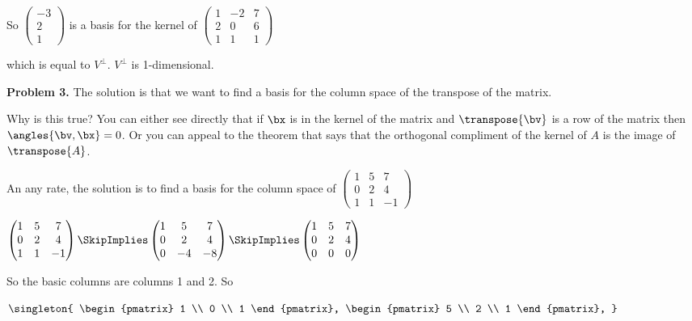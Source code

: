 \documentclass[oneside,12pt]{amsart}
\begin{document}
\bigskip

So $
\begin{pmatrix}
-3 \\ 2 \\ 1
\end{pmatrix}
$ is a basis for the kernel of $
\begin{pmatrix}
1 & -2 & 7\\
2 & 0 & 6 \\
1 & 1 & 1
\end{pmatrix}
$

which is equal to $V^{\perp}$. $V^{\perp}$ is 1-dimensional.

\bigskip
\bigskip

\textbf{Problem 3.} The solution
is that we want to find a basis for the column space of the transpose of the
matrix.

\bigskip

Why is this true? You can either see directly that if $\bx$
is in the kernel of the matrix and $\transpose{\bv}$ is a row of the matrix
then $\angles{\bv,\bx} = 0$. Or you can appeal to the theorem that says that
the orthogonal compliment of the kernel of $A$ is the image of $\transpose{A}$.

\bigskip

An any rate, the solution is to find a basis for the column space of $
\begin{pmatrix}
1 & 5 & 7 \\
0 & 2 & 4 \\
1 & 1 & -1
\end{pmatrix}
$

\bigskip

$
\begin{pmatrix}
1 & 5 & 7 \\
0 & 2 & 4 \\
1 & 1 & -1
\end{pmatrix}
\SkipImplies
\begin{pmatrix}
1 & 5 & 7 \\
0 & 2 & 4 \\
0 & -4 & -8
\end{pmatrix}
\SkipImplies
\begin{pmatrix}
1 & 5 & 7 \\
0 & 2 & 4 \\
0 & 0 & 0
\end{pmatrix}
$

\bigskip

So the basic columns are columns 1 and 2. So

$
\singleton{
\begin{pmatrix}
1 \\
0 \\
1
\end{pmatrix},
\begin{pmatrix}
5 \\
2 \\
1
\end{pmatrix},
}
$
\end{document}

